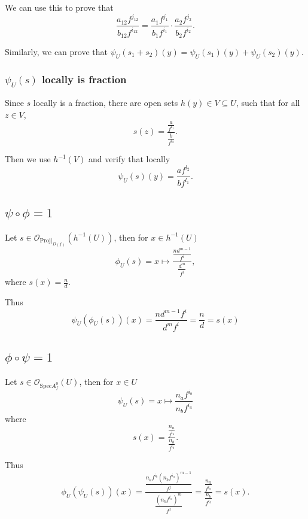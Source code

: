 \documentclass[11pt]{article}
\begin{document}
We can use this to prove that \[
\frac{a_{12}f^{j_{12}}}{b_{12}f^{i_{12}}}=\frac{a_1f^{j_1}}{b_1f^{i_1}}\cdot\frac{a_2f^{j_2}}{b_2f^{i_2}}.
\]

Similarly, we can prove that
\(\psi_U(s_1+s_2)(y)=\psi_U(s_1)(y)+\psi_U(s_2)(y)\).

    \hypertarget{psi_us-locally-is-fraction}{%
\subsubsection{\texorpdfstring{\(\psi_U(s)\) locally is
fraction}{\textbackslash psi\_U(s) locally is fraction}}\label{psi_us-locally-is-fraction}}

Since \(s\) locally is a fraction, there are open sets
\(h(y)\in V\subseteq U\), such that for all \(z\in V\), \[
s(z)=\frac{\frac{a}{f^{l_1}}}{\frac{b}{f^{l_2}}}.
\]

Then we use \(h^{-1}(V)\) and verify that locally \[
\psi_U(s)(y)=\frac{af^{l_2}}{bf^{l_1}}.
\]

    \hypertarget{psicircphi1}{%
\subsection{\texorpdfstring{\(\psi\circ\phi=1\)}{\textbackslash psi\textbackslash circ\textbackslash phi=1}}\label{psicircphi1}}

Let \(s\in\mathcal O_{\mathrm{Proj}|_{D(f)}}(h^{-1}(U))\), then for
\(x\in h^{-1}(U)\) \[
\phi_U(s)=x\mapsto \frac{\frac{nd^{m-1}}{f^i}}{\frac{d^m}{f^i}},
\] where \(s(x)=\frac n d\).

Thus \[
\psi_U(\phi_U(s))(x)=\frac{nd^{m-1}f^i}{d^mf^i}=\frac n d=s(x)
\]

    \hypertarget{phicircpsi1}{%
\subsection{\texorpdfstring{\(\phi\circ\psi=1\)}{\textbackslash phi\textbackslash circ\textbackslash psi=1}}\label{phicircpsi1}}

Let \(s\in\mathcal O_{\mathrm{Spec}A^0_f}(U)\), then for \(x\in U\) \[
\psi_U(s)=x\mapsto \frac{n_af^{i_b}}{n_bf^{i_a}}
\] where \[s(x)=\frac{\frac{n_a}{f^{i_a}}}{\frac{n_b}{f^{i_b}}}.\]

Thus \[
\phi_U(\psi_U(s))(x)=\frac{\frac{n_af^{i_b}\left(n_bf^{i_a}\right)^{m-1}}{f^{j}}}{\frac{\left(n_bf^{i_a}\right)^m}{f^{j}}}=\frac{\frac{n_a}{f^{i_a}}}{\frac{n_b}{f^{i_b}}}=s(x).
\]


    
    
    
\end{document}

